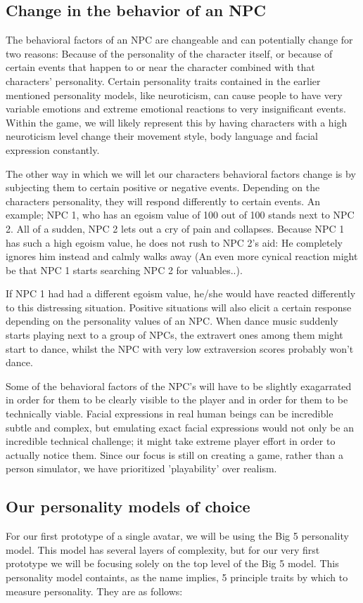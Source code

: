 \documentclass{article}
\begin{document}
  \newpage
  \subsection{Change in the behavior of an NPC}
  The behavioral factors of an NPC are changeable and can potentially change for two reasons: Because of the personality of the character itself, or because of certain events that happen to or near the character combined with that characters' personality. Certain personality traits contained in the earlier mentioned personality models, like neuroticism, can cause people to have very variable emotions and extreme emotional reactions to very insignificant events. Within the game, we will likely represent this by having characters with a high neuroticism level change their movement style, body language and facial expression constantly.

  The other way in which we will let our characters behavioral factors change is by subjecting them to certain positive or negative events. Depending on the characters personality, they will respond differently to certain events. An example; NPC 1, who has an egoism value of 100 out of 100 stands next to NPC 2. All of a sudden, NPC 2 lets out a cry of pain and collapses. Because NPC 1 has such a high egoism value, he does not rush to NPC 2's aid: He completely ignores him instead and calmly walks away (An even more cynical reaction might be that NPC 1 starts searching NPC 2 for valuables..).

  If NPC 1 had had a different egoism value, he/she would have reacted differently to this distressing situation. Positive situations will also elicit a certain response depending on the personality values of an NPC. When dance music suddenly starts playing next to a group of NPCs, the extravert ones among them might start to dance, whilst the NPC with very low extraversion scores probably won't dance. 

  Some of the behavioral factors of the NPC's will have to be slightly exagarrated in order for them to be clearly visible to the player and in order for them to be technically viable. Facial expressions in real human beings can be incredible subtle and complex, but emulating exact facial expressions would not only be an incredible technical challenge; it might take extreme player effort in order to actually notice them. Since our focus is still on creating a game, rather than a person simulator, we have prioritized 'playability' over realism.


  \newpage
  \subsection{Our personality models of choice}
   For our first prototype of a single avatar, we will be using the Big 5 personality model. This model has several layers of complexity, but for our very first prototype we will be focusing solely on the top level of the Big 5 model. This personality model containts, as the name implies, 5 principle traits by which to measure personality. They are as follows:
\end{document}
